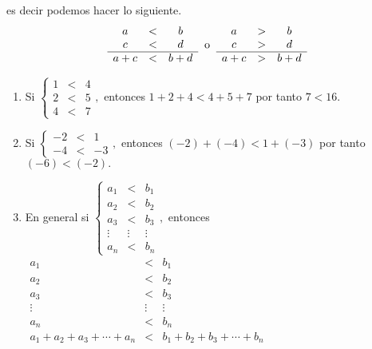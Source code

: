 es decir podemos hacer lo siguiente. 
\[
\begin{array}{ccc}
a & < & b\\
c & < & d\\
\hline a+c & < & b+d
\end{array}\;\;\text{o\;\;\ensuremath{\begin{array}{ccc}
 \text{\text{\ensuremath{a}}}  &  >  &  \text{\ensuremath{b}}\\
 \text{\ensuremath{c}}  &  >  &  \text{\ensuremath{d}}\\
\hline  \text{\ensuremath{a+c}}  &  >  &  \text{\ensuremath{b+d}} 
\end{array}}}
\]
\begin{ejemplos}
\begin{enumerate}
\item Si $\left\{ \begin{array}{ccc}
1 & < & 4\\
2 & < & 5\\
4 & < & 7
\end{array}\right.,$ entonces $1+2+4<4+5+7$ por tanto $7<16.$
\item Si $\left\{ \begin{array}{ccc}
-2 & < & 1\\
-4 & < & -3
\end{array}\right.,$ entonces $\left(-2\right)+\left(-4\right)<1+\left(-3\right)$ por
tanto $\left(-6\right)<\left(-2\right).$
\item En general si $\left\{ \begin{array}{ccc}
a_{1} & < & b_{1}\\
a_{2} & < & b_{2}\\
a_{3} & < & b_{3}\\
\vdots & \vdots & \vdots\\
a_{n} & < & b_{n}
\end{array}\right.,$ entonces \foreignlanguage{english}{$\begin{array}{ccc}
a_{1} & < & b_{1}\\
a_{2} & < & b_{2}\\
a_{3} & < & b_{3}\\
\vdots & \vdots & \vdots\\
a_{n} & < & b_{n}\\
\hline a_{1}+a_{2}+a_{3}+\cdots+a_{n} & < & b_{1}+b_{2}+b_{3}+\cdots+b_{n}
\end{array}\;$}
\end{enumerate}
\end{ejemplos}

